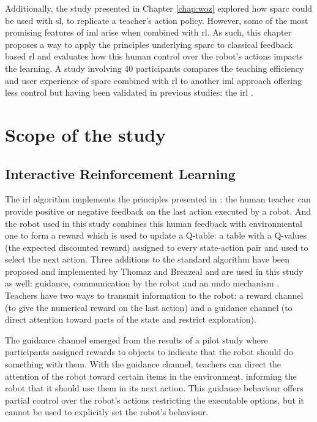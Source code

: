 Additionally, the study presented in Chapter \ref{chap:woz} explored how \gls{sparc} could be used with \acrlong{sl}, to replicate a teacher's action policy. However, some of the most promising features of \gls{iml} arise when combined with \acrfull{rl}. As such, this chapter proposes a way to apply the principles underlying \gls{sparc} to classical feedback based \gls{rl} and evaluates how this human control over the robot's actions impacts the learning. A study involving 40 participants compares the teaching efficiency and user experience of \gls{sparc} combined with \gls{rl} to another \gls{iml} approach offering less control but having been validated in previous studies: the \acrfull{irl} \citep{thomaz2008teachable}. %

\section{Scope of the study}

\subsection{Interactive Reinforcement Learning}

The \gls{irl} algorithm implements the principles presented in \cite{thomaz2008teachable}: the human teacher can provide positive or negative feedback on the last action executed by a robot. And the robot used in this study combines this human feedback with environmental one to form a reward which is used to update a Q-table: a table with a Q-values (the expected discounted reward) assigned to every state-action pair and used to select the next action. Three additions to the standard algorithm have been proposed and implemented by Thomaz and Breazeal and are used in this study as well: guidance, communication by the robot and an undo mechanism \citep{thomaz2008teachable}. Teachers have two ways to transmit information to the robot: a reward channel (to give the numerical reward on the last action) and a guidance channel (to direct attention toward parts of the state and restrict exploration).

The guidance channel emerged from the results of a pilot study where participants assigned rewards to objects to indicate that the robot should do something with them. With the guidance channel, teachers can direct the attention of the robot toward certain items in the environment, informing the robot that it should use them in its next action. This guidance behaviour offers partial control over the robot's actions restricting the executable options, but it cannot be used to explicitly set the robot's behaviour. 

